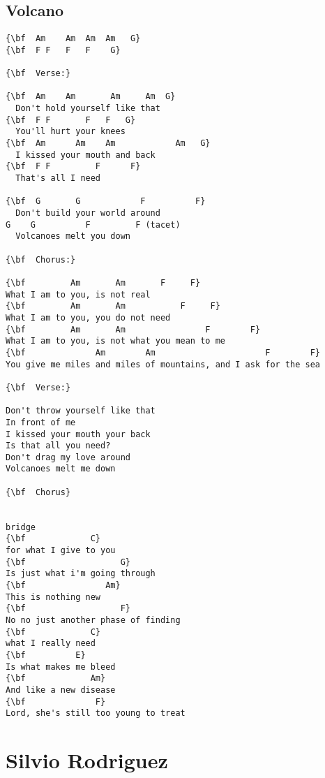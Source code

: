 \documentclass[a4paper]{article}
\begin{document}
\subsection{Volcano}
\begin{Verbatim}[commandchars=\\\{\}]
{\bf  Am	Am	Am	Am   G}
{\bf  F	F	F	F    G}

{\bf  Verse:}

{\bf  Am	Am	     Am	  	Am  G}
  Don't hold yourself like that
{\bf  F	F		F	F   G}
  You'll hurt your knees
{\bf  Am      Am	Am            Am   G}
  I kissed your mouth and back
{\bf  F	F         F      F}
  That's all I need

{\bf  G       G            F          F}
  Don't build your world around
G    G          F         F (tacet)
  Volcanoes melt you down

{\bf  Chorus:}

{\bf         Am       Am       F     F}
What I am to you, is not real
{\bf         Am       Am           F     F}
What I am to you, you do not need
{\bf         Am       Am                F        F}
What I am to you, is not what you mean to me
{\bf              Am        Am                      F        F}
You give me miles and miles of mountains, and I ask for the sea

{\bf  Verse:}

Don't throw yourself like that
In front of me
I kissed your mouth your back
Is that all you need?
Don't drag my love around
Volcanoes melt me down

{\bf  Chorus}


bridge
{\bf             C}
for what I give to you
{\bf                   G}
Is just what i'm going through
{\bf                Am}
This is nothing new
{\bf                   F}
No no just another phase of finding
{\bf             C}
what I really need
{\bf          E}
Is what makes me bleed
{\bf             Am}
And like a new disease
{\bf              F}
Lord, she's still too young to treat

\end{Verbatim}
\newpage
\section{Silvio Rodriguez}
\end{document}
